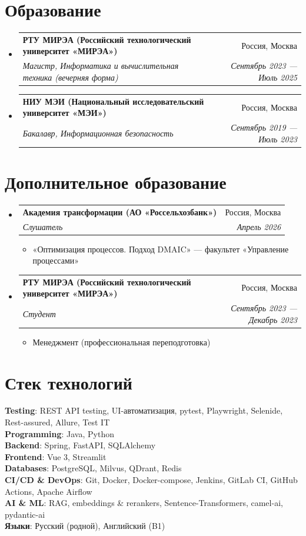 \documentclass[letterpaper,12pt]{article}
\makeatletter
\newcommand{\resumeItem}[1]{
  \item\small{
    {#1 \vspace{-2pt}}
  }
}
\newcommand{\resumeSubheading}[4]{
  \vspace{-2pt}\item
    \begin{tabular*}{0.97\textwidth}[t]{l@{\extracolsep{\fill}}r}
      \textbf{#1} & #2 \\
      \textit{\small#3} & \textit{\small #4} \\
    \end{tabular*}\vspace{-7pt}
}
\newcommand{\resumeSubHeadingListStart}{\begin{itemize}[leftmargin=0.15in, label={}]}
\newcommand{\resumeSubHeadingListEnd}{\end{itemize}}
\newcommand{\resumeItemListStart}{\begin{itemize}}
\newcommand{\resumeItemListEnd}{\end{itemize}\vspace{-5pt}}
\makeatother
\begin{document}
\section{Образование}
  \resumeSubHeadingListStart
    \resumeSubheading
      {РТУ МИРЭА (Российский технологический университет «МИРЭА»)}{Россия, Москва}
      {Магистр, Информатика и вычислительная техника (вечерняя форма)}{Сентябрь 2023 --- Июль 2025}
    \resumeSubheading
      {НИУ МЭИ (Национальный исследовательский университет «МЭИ»)}{Россия, Москва}
      {Бакалавр, Информационная безопасность}{Сентябрь 2019 --- Июль 2023}
  \resumeSubHeadingListEnd


\section{Дополнительное образование}
  \resumeSubHeadingListStart
    \resumeSubheading
      {Академия трансформации (АО «Россельхозбанк»)}{Россия, Москва}
      {Слушатель}{Апрель 2026}
      \resumeItemListStart
        \resumeItem{«Оптимизация процессов. Подход DMAIC» --- факультет «Управление процессами»}
      \resumeItemListEnd
    \resumeSubheading
      {РТУ МИРЭА (Российский технологический университет «МИРЭА»)}{Россия, Москва}
      {Студент}{Сентябрь 2023 --- Декабрь 2023}
      \resumeItemListStart
        \resumeItem{Менеджмент (профессиональная переподготовка)}
      \resumeItemListEnd
  \resumeSubHeadingListEnd


\section{Стек технологий}
 \begin{itemize}[leftmargin=0.15in, label={}]
    \small{\item{
     \textbf{Testing}{: REST API testing, UI-автоматизация, pytest, Playwright, Selenide, Rest-assured, Allure, Test IT} \\
     \textbf{Programming}{: Java, Python} \\
     \textbf{Backend}{: Spring, FastAPI, SQLAlchemy} \\
     \textbf{Frontend}{: Vue 3, Streamlit} \\
     \textbf{Databases}{: PostgreSQL, Milvus, QDrant, Redis} \\
     \textbf{CI/CD \& DevOps}{: Git, Docker, Docker-compose, Jenkins, GitLab CI, GitHub Actions, Apache Airflow} \\
     \textbf{AI \& ML}{: RAG, embeddings \& rerankers, Sentence-Transformers, camel-ai, pydantic-ai} \\
     \textbf{Языки}{: Русский (родной), Английский (B1)}
    }}
 \end{itemize}


\end{document}
